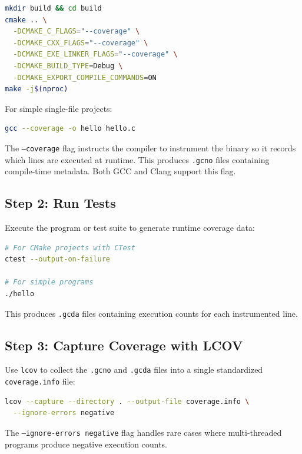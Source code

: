 \begin{lstlisting}[language=bash, caption={Building with coverage using CMake}]
mkdir build && cd build
cmake .. \
  -DCMAKE_C_FLAGS="--coverage" \
  -DCMAKE_CXX_FLAGS="--coverage" \
  -DCMAKE_EXE_LINKER_FLAGS="--coverage" \
  -DCMAKE_BUILD_TYPE=Debug \
  -DCMAKE_EXPORT_COMPILE_COMMANDS=ON
make -j$(nproc)
\end{lstlisting}

For simple single-file projects:
\begin{lstlisting}[language=bash, caption={Building a single file with coverage}]
gcc --coverage -o hello hello.c
\end{lstlisting}

The \texttt{--coverage} flag instructs the compiler to instrument the binary so it records which lines are executed at runtime. This produces \texttt{.gcno} files containing compile-time metadata. Both GCC and Clang support this flag.

\subsection{Step 2: Run Tests}

Execute the program or test suite to generate runtime coverage data:

\begin{lstlisting}[language=bash, caption={Running tests to generate coverage data}]
# For CMake projects with CTest
ctest --output-on-failure

# For simple programs
./hello
\end{lstlisting}

This produces \texttt{.gcda} files containing execution counts for each instrumented line.

\subsection{Step 3: Capture Coverage with LCOV}

Use \texttt{lcov} to collect the \texttt{.gcno} and \texttt{.gcda} files into a single standardized \texttt{coverage.info} file:

\begin{lstlisting}[language=bash, caption={Capturing coverage data with lcov}]
lcov --capture --directory . --output-file coverage.info \
  --ignore-errors negative
\end{lstlisting}

The \texttt{--ignore-errors negative} flag handles rare cases where multi-threaded programs produce negative execution counts.

